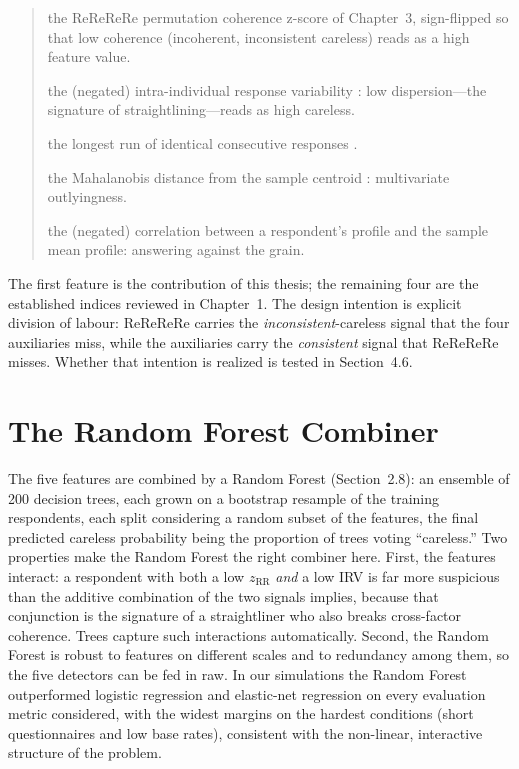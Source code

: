 \documentclass[doc,11pt,donotrepeattitle]{apa7}
\begin{document}
\begin{quote}
\small
\begin{description}\setlength{\itemsep}{2pt}
\item[$z_{\text{RR}}$] the ReReReRe permutation coherence z-score of Chapter~3,
  sign-flipped so that low coherence (incoherent, inconsistent careless) reads
  as a high feature value.
\item[IRV] the (negated) intra-individual response variability
  \parencite{dunn2018intra}: low dispersion---the signature of
  straightlining---reads as high careless.
\item[LongString] the longest run of identical consecutive responses
  \parencite{johnson2005ascertaining}.
\item[$D^2$] the Mahalanobis distance from the sample centroid
  \parencite{mahalanobis1936generalised}: multivariate outlyingness.
\item[Person--Total] the (negated) correlation between a respondent's profile
  and the sample mean profile: answering against the grain.
\end{description}
\end{quote}

The first feature is the contribution of this thesis; the remaining four are the
established indices reviewed in Chapter~1. The design intention is explicit
division of labour: ReReReRe carries the \emph{inconsistent}-careless signal that
the four auxiliaries miss, while the auxiliaries carry the \emph{consistent}
signal that ReReReRe misses. Whether that intention is realized is tested in
Section~4.6.

\section{The Random Forest Combiner}

The five features are combined by a Random Forest (Section~2.8): an ensemble of
200 decision trees, each grown on a bootstrap resample of the training
respondents, each split considering a random subset of the features, the final
predicted careless probability being the proportion of trees voting
``careless.'' Two properties make the Random Forest the right combiner here.
First, the features interact: a respondent with both a low $z_{\text{RR}}$
\emph{and} a low IRV is far more suspicious than the additive combination of the
two signals implies, because that conjunction is the signature of a
straightliner who also breaks cross-factor coherence. Trees capture such
interactions automatically. Second, the Random Forest is robust to features on
different scales and to redundancy among them, so the five detectors can be fed
in raw. In our simulations the Random Forest outperformed logistic regression
and elastic-net regression on every evaluation metric considered, with the
widest margins on the hardest conditions (short questionnaires and low base
rates), consistent with the non-linear, interactive structure of the problem.
\end{document}
